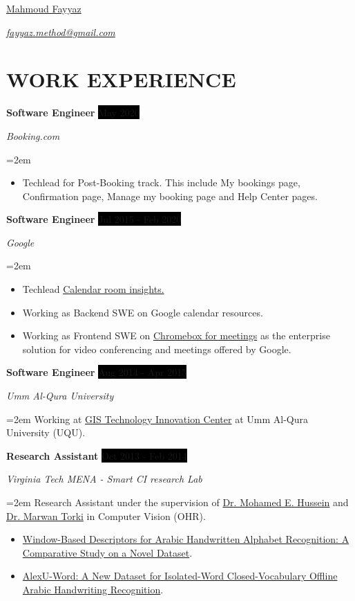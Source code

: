 \documentclass[paper=a4,fontsize=11pt]{scrartcl} %
\newcommand{\sepspace}{\vspace*{0.5em}}		%
\newcommand{\MyName}[1]{ %
		\Huge \usefont{OT1}{phv}{b}{n} \hfill #1
		\par \normalsize \normalfont}
\newcommand{\MySlogan}[1]{ %
		\large \usefont{OT1}{phv}{m}{n}\hfill \textit{#1}
		\par \normalsize \normalfont}
\newcommand{\NewPart}[1]{\section*{\uppercase{#1}}}
\newcommand{\EducationEntry}[4]{
		\noindent \textbf{#1} \hfill      %
		\colorbox{Black}{%
			\parbox{6em}{%
			\hfill\color{White}#2}} \par  %
		\noindent \textit{#3} \par        %
		\noindent\hangindent=2em\hangafter=0 \small #4 %
		\normalsize \par}
\newcommand{\WorkEntry}[4]{				  %
		\noindent \textbf{#1} \hfill      %
		\colorbox{Black}{\color{White}#2} \par  %
		\noindent \textit{#3} \par              %
		\noindent\hangindent=2em\hangafter=0 \small #4 %
		\normalsize \par}
\begin{document}

\MyName{\href{http://phiiaz.github.io/Resume}{Mahmoud Fayyaz}}
\MySlogan{\href{mailto:fayyaz.method@gmail.com}{fayyaz.method@gmail.com}}

\sepspace

\NewPart{Work experience}{}

\WorkEntry{Software Engineer}{May 2020}{Booking.com}{
	\begin{itemize}
		\item Techlead for Post-Booking track. This include My bookings page, Confirmation page, Manage my booking page and Help Center pages.  
	\end{itemize}}
\sepspace

	\WorkEntry{Software Engineer}{Jul 2015 - Feb 2020}{Google}{
	\begin{itemize}
		\item Techlead \href{https://gsuiteupdates.googleblog.com/2018/08/manage-meeting-rooms-efficiently.html}{\color{blue}Calendar room insights.}
		\item Working as Backend SWE on Google calendar resources.
		\item Working as Frontend SWE on \href{https://www.google.se/work/chrome/devices/for-meetings/}{\color{blue}Chromebox for meetings} as the enterprise solution for video conferencing and meetings offered by Google.
	\end{itemize}}
\sepspace

	\WorkEntry{Software Engineer}{Aug 2014 - Apr 2015}{Umm Al-Qura University}{Working at \href{http://www.gistic.org/}{\color{blue}GIS Technology Innovation Center} at Umm Al-Qura University (UQU).}

	\WorkEntry{Research Assistant}{Oct 2013 - Feb 2014}{Virginia Tech MENA - Smart CI research Lab}{Research Assistant under the supervision of \href{http://scholar.google.com/citations?user=jCUt0o0AAAAJ&hl=en}{\color{blue}Dr. Mohamed E. Hussein} and \href{http://scholar.google.com/citations?user=aYLNZT4AAAAJ&hl=en}{\color{blue}Dr. Marwan Torki} in Computer Vision (OHR).
	\begin{itemize}
		\item \href{http://arxiv.org/abs/1411.3519}{\color{blue}Window-Based Descriptors for Arabic Handwritten Alphabet Recognition: A Comparative Study on a Novel Dataset}.
		\item \href{http://arxiv.org/abs/1411.4670}{\color{blue}AlexU-Word: A New Dataset for Isolated-Word Closed-Vocabulary Offline Arabic Handwriting Recognition}.
	\end{itemize}}
\end{document}
